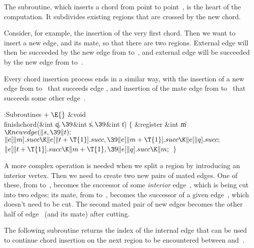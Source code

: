The  subroutine, which inserts a chord from point  to
point~, is the heart of the computation. It subdivides existing regions
that are crossed by the new chord.

Consider, for example, the insertion of the very first chord. Then
we want to insert a new edge, and its mate, so that there are two regions.
External edge  will then be succeeded by the new edge from  to~,
and external edge  will be succeeded by the new edge from  to~.

Every chord insertion process ends in a similar way, with the
insertion of a new edge from  to~ that succeeds edge ,
and insertion of the mate edge from  to~ that succeeds some
other edge~.

\Y\B\4:Subroutines\X${}\mathrel+\E{}$\6
\&{void} \\{finishchord}(\&{int} \|q${},\39{}$\&{int} \|s${},\39{}$\&{int} \|t)%
\1\1\2\2\6
${}\{{}$\1\6
\&{register} \&{int} \|m${}\K\\{newedge}(\|s,\39\|t);{}$\7
${}\|e[\|m].\\{succ}\K\|e[\|t+\T{1}].\\{succ},\39\|e[\|m+\T{1}].\\{succ}\K\|e[%
\|q].\\{succ};{}$\6
${}\|e[\|t+\T{1}].\\{succ}\K\|m+\T{1},\39\|e[\|q].\\{succ}\K\|m;{}$\6
\4${}\}{}$\2\par
\fi

A more complex operation is needed when we split a region by introducing
an interior vertex. Then we need to create two new pairs of mated edges.
One of these, from  to~, becomes the successor of some
{\it interior\/} edge~, which is being cut into two edges; its mate,
from  to~, becomes the successor of a given edge~,
which
doesn't need to be cut. The second mated pair of new edges becomes
the other half of edge~ (and its mate) after cutting.

The following subroutine returns the index of the internal edge that
can be used to continue chord insertion on the next region to be
encountered between  and~.

